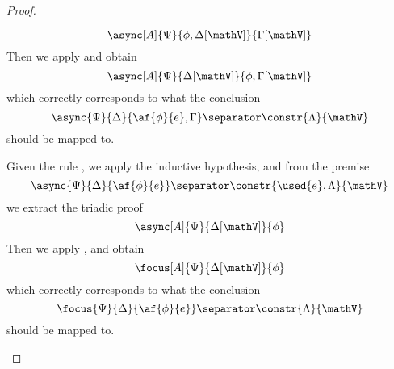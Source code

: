 \begin{proof}
\begin{itemize}
\begin{itemize}
					$$ \async[A]{\Psi}{\phi, \Delta[\mathV]}{\Gamma[\mathV]} $$
					Then we apply \derRule[A]{\displaytodelta} and obtain
					$$ \async[A]{\Psi}{\Delta[\mathV]}{\phi, \Gamma[\mathV]} $$
					which correctly corresponds to what the conclusion
					$$ \async{\Psi}{\Delta}{\af{\phi}{e}, \Gamma} \separator \constr{\Lambda}{\mathV} $$
					should be mapped to.
			\end{itemize}
		\indCase{\displaytoasy} Given the rule \derRule{\displaytoasy}, we apply the inductive hypothesis, and from the premise
			$$ \async{\Psi}{\Delta}{\af{\phi}{e}} \separator \constr{\used{e}, \Lambda}{\mathV} $$
			we extract the triadic proof
			$$ \async[A]{\Psi}{\Delta[\mathV]}{\phi} $$
			Then we apply \derRule[A]{\displaytoasy}, and obtain
			$$ \focus[A]{\Psi}{\Delta[\mathV]}{\phi} $$
			which correctly corresponds to what the conclusion 
			$$ \focus{\Psi}{\Delta}{\af{\phi}{e}} \separator \constr{\Lambda}{\mathV} $$
			should be mapped to.
	\end{itemize}
\end{proof}



